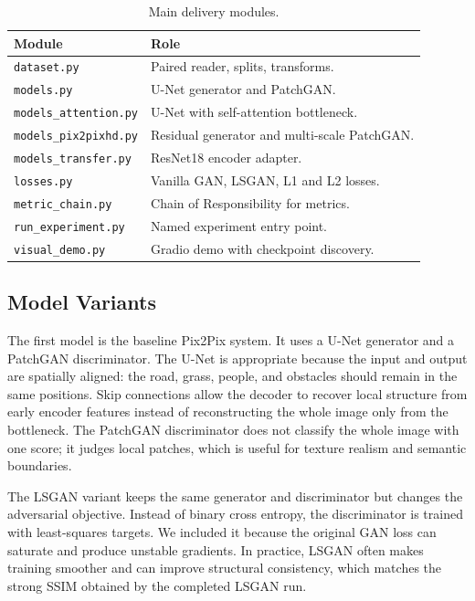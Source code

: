 \documentclass[conference]{IEEEtran}
\newcommand{\code}[1]{\texttt{#1}}
\begin{document}
\begin{table}[H]
\caption{Main delivery modules.}
\label{tab:modules}
\centering
\scriptsize
\begin{tabular}{p{}p{}}
\toprule
Module & Role \\
\midrule
\code{dataset.py} & Paired reader, splits, transforms. \\
\code{models.py} & U-Net generator and PatchGAN. \\
\code{models\_attention.py} & U-Net with self-attention bottleneck. \\
\code{models\_pix2pixhd.py} & Residual generator and multi-scale PatchGAN. \\
\code{models\_transfer.py} & ResNet18 encoder adapter. \\
\code{losses.py} & Vanilla GAN, LSGAN, L1 and L2 losses. \\
\code{metric\_chain.py} & Chain of Responsibility for metrics. \\
\code{run\_experiment.py} & Named experiment entry point. \\
\code{visual\_demo.py} & Gradio demo with checkpoint discovery. \\
\bottomrule
\end{tabular}
\end{table}
\FloatBarrier


\subsection{Model Variants}
The first model is the baseline Pix2Pix system. It uses a U-Net generator and a PatchGAN discriminator. The U-Net is appropriate because the input and output are spatially aligned: the road, grass, people, and obstacles should remain in the same positions. Skip connections allow the decoder to recover local structure from early encoder features instead of reconstructing the whole image only from the bottleneck. The PatchGAN discriminator does not classify the whole image with one score; it judges local patches, which is useful for texture realism and semantic boundaries.

The LSGAN variant keeps the same generator and discriminator but changes the adversarial objective. Instead of binary cross entropy, the discriminator is trained with least-squares targets. We included it because the original GAN loss can saturate and produce unstable gradients. In practice, LSGAN often makes training smoother and can improve structural consistency, which matches the strong SSIM obtained by the completed LSGAN run.
\end{document}
